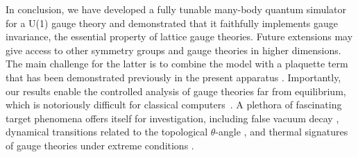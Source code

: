 \documentclass[aps,prl,twocolumn,superscriptaddress,footinbib,linenumbers]{revtex4}
\begin{document}
In conclusion, we have developed a fully tunable many-body quantum simulator for a U(1) gauge theory and demonstrated that it faithfully implements gauge invariance, the essential property of lattice gauge theories. Future extensions may give access to other symmetry groups and gauge theories in higher dimensions. The main challenge for the latter is to combine the model with a plaquette term that has been demonstrated previously in the present apparatus \cite{Dai:2017}. Importantly, our results enable the controlled analysis of gauge theories far from equilibrium, which is notoriously difficult for classical computers~\cite{Wiese:2013,Zohar:2015,Dalmonte:2016,Banuls:2019}. A plethora of fascinating target phenomena offers itself for investigation, including false vacuum decay \cite{Hauke:2013,Yang:2016}, dynamical transitions related to the topological $\theta$-angle \cite{Zache:2019,Huang:2019,Magnifico:2019}, and thermal signatures of gauge theories under extreme conditions \cite{Berges:2018}.


\end{document}
